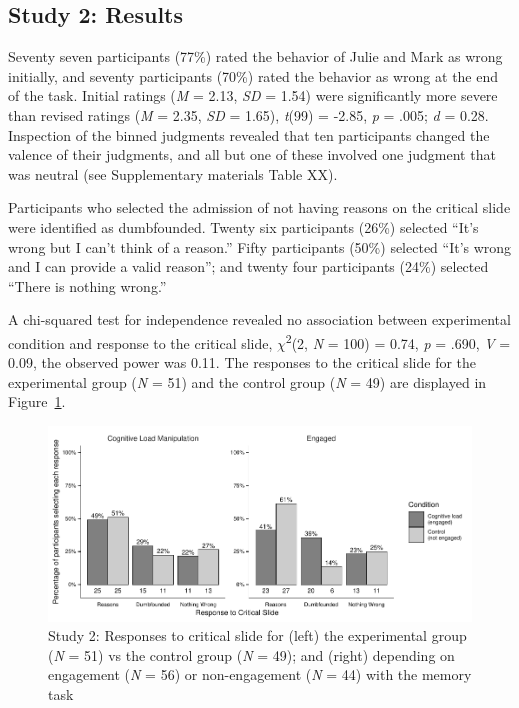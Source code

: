\documentclass[
  american,
  man,floatsintext]{apa7}
\begin{document}
\hypertarget{study-2-results}{%
\subsection{Study 2: Results}\label{study-2-results}}

Seventy seven participants (77\%) rated the behavior of Julie and Mark as wrong initially, and seventy participants (70\%) rated the behavior as wrong at the end of the task. Initial ratings (\emph{M} = 2.13, \emph{SD} = 1.54) were significantly more severe than revised ratings (\emph{M} = 2.35, \emph{SD} = 1.65), \emph{t}(99) = -2.85, \emph{p} = .005; \emph{d} = 0.28. Inspection of the binned judgments revealed that ten participants changed the valence of their judgments, and all but one of these involved one judgment that was neutral (see Supplementary materials Table XX).

Participants who selected the admission of not having reasons on the critical slide were identified as dumbfounded. Twenty six participants (26\%) selected ``It's wrong but I can't think of a reason.'' Fifty participants (50\%) selected ``It's wrong and I can provide a valid reason''; and twenty four participants (24\%) selected ``There is nothing wrong.''

A chi-squared test for independence revealed no association between experimental condition and response to the critical slide, \(\chi\)\textsuperscript{2}(2, \emph{N} = 100) = 0.74, \emph{p} = .690, \emph{V} = 0.09, the observed power was 0.11. The responses to the critical slide for the experimental group (\emph{N} = 51) and the control group (\emph{N} = 49) are displayed in Figure~\ref{fig:S2figboth}.

\begin{figure}
\centering
\includegraphics{cog_load_in_chunks_files/figure-latex/S2figboth-1.pdf}
\caption{\label{fig:S2figboth}Study 2: Responses to critical slide for (left) the experimental group (\emph{N} = 51) vs the control group (\emph{N} = 49); and (right) depending on engagement (\emph{N} = 56) or non-engagement (\emph{N} = 44) with the memory task}
\end{figure}
\end{document}
